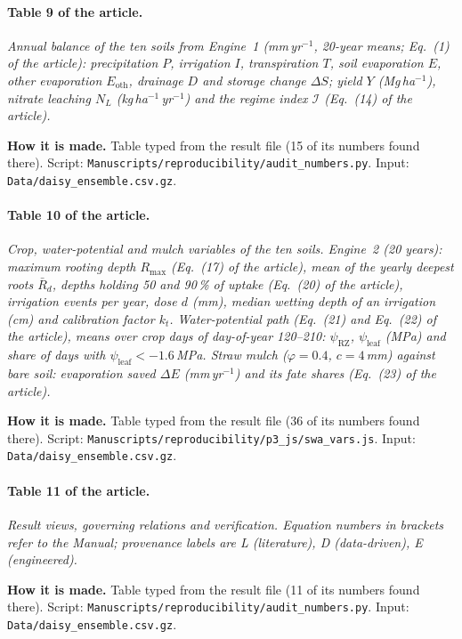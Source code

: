\paragraph{Table 9 of the article.} \emph{Annual balance of the ten soils from Engine~1 (mm\,yr$^{-1}$, 20-year means; Eq.~(1) of the article): precipitation $P$, irrigation $I$, transpiration $T$, soil evaporation $E$, other evaporation $E_{\mathrm{oth}}$, drainage $D$ and storage change $\Delta S$; yield $Y$ (Mg\,ha$^{-1}$), nitrate leaching $N_L$ (kg\,ha$^{-1}$\,yr$^{-1}$) and the regime index $\mathcal I$ (Eq.~(14) of the article).}

\textbf{How it is made.} Table typed from the result file (15 of its numbers found there). Script: \nolinkurl{Manuscripts/reproducibility/audit_numbers.py}. Input: \nolinkurl{Data/daisy_ensemble.csv.gz}.

\paragraph{Table 10 of the article.} \emph{Crop, water-potential and mulch variables of the ten soils. Engine~2 (20 years): maximum rooting depth $R_{\max}$ (Eq.~(17) of the article), mean of the yearly deepest roots $\bar R_d$, depths holding 50 and 90\,\% of uptake (Eq.~(20) of the article), irrigation events per year, dose $d$ (mm), median wetting depth of an irrigation (cm) and calibration factor $k_t$. Water-potential path (Eq.~(21) and Eq.~(22) of the article), means over crop days of day-of-year 120--210: $\psi_{\mathrm{RZ}}$, $\psi_{\mathrm{leaf}}$ (MPa) and share of days with $\psi_{\mathrm{leaf}}<-1.6$\,MPa. Straw mulch ($\varphi=0.4$, $c=4$\,mm) against bare soil: evaporation saved $\Delta E$ (mm\,yr$^{-1}$) and its fate shares (Eq.~(23) of the article).}

\textbf{How it is made.} Table typed from the result file (36 of its numbers found there). Script: \nolinkurl{Manuscripts/reproducibility/p3_js/swa_vars.js}. Input: \nolinkurl{Data/daisy_ensemble.csv.gz}.

\paragraph{Table 11 of the article.} \emph{Result views, governing relations and verification. Equation numbers in brackets refer to the Manual; provenance labels are L (literature), D (data-driven), E (engineered).}

\textbf{How it is made.} Table typed from the result file (11 of its numbers found there). Script: \nolinkurl{Manuscripts/reproducibility/audit_numbers.py}. Input: \nolinkurl{Data/daisy_ensemble.csv.gz}.

